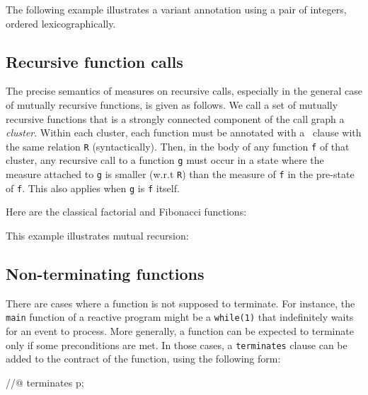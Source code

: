 \begin{example}
  The following example illustrates a variant annotation
  using a pair of integers, ordered lexicographically.
\end{example}

\subsection{Recursive function calls}

The precise semantics of measures on recursive calls, especially in
the general case of mutually recursive functions, is given as follows.
We call a set of mutually recursive functions that
is a strongly connected component of the call graph
a \emph{cluster}.
Within each cluster, each function must be annotated with a \decreases\
clause with the same relation \lstinline|R| (syntactically). Then, in the body
of any function \lstinline|f| of that cluster, any recursive call to a function
\lstinline|g| must occur in a state where the measure attached to
\lstinline|g| is smaller
(w.r.t \lstinline|R|) than the measure of \lstinline|f| in the pre-state of \lstinline|f|. This also
applies when \lstinline|g| is \lstinline|f| itself.

\begin{example}
  Here are the classical factorial and Fibonacci functions:
\end{example}

\begin{example}
  This example illustrates mutual recursion:
\end{example}

\subsection{Non-terminating functions}
\label{sec:non-term-funct}

There are cases where a function is not supposed to terminate. For
instance, the \lstinline|main| function of a reactive program might be a
\lstinline|while(1)| that indefinitely waits for an event to process. More
generally, a function can be expected to terminate only if some
preconditions are met. In those cases, a \lstinline|terminates| clause can
be added to the contract of the function, using the following form:

\begin{listing-nonumber}
//@ terminates p;
\end{listing-nonumber}

